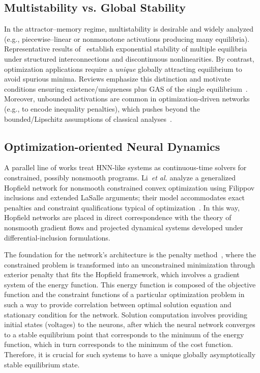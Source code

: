 \documentclass[journal]{IEEEtran}
\begin{document}
\subsection{Multistability vs. Global Stability}
In the attractor–memory regime, multistability is desirable and widely analyzed 
(e.g., piecewise–linear or nonmonotone activations producing many equilibria). 
Representative results of~\cite{NieZheng2015} establish exponential stability 
of multiple equilibria under structured interconnections and discontinuous nonlinearities. 
By contrast, optimization applications require a \emph{unique} globally attracting equilibrium 
to avoid spurious minima. 
Reviews emphasize this distinction and motivate conditions ensuring existence/uniqueness plus GAS 
of the single equilibrium~\cite{ZhangTNNLSReview2014}. 
Moreover, unbounded activations are common in optimization-driven networks 
(e.g., to encode inequality penalties), which pushes beyond the bounded/Lipschitz assumptions 
of classical analyses~\cite{NieZheng2015}.

\subsection{Optimization-oriented Neural Dynamics}

A parallel line of works treat HNN-like systems as continuous-time solvers for constrained, 
possibly nonsmooth programs. 
Li~\emph{et al.} analyze a generalized Hopfield network for nonsmooth constrained convex optimization 
using Filippov inclusions and extended LaSalle arguments; 
their model accommodates exact penalties and constraint qualifications typical of optimization~\cite{LiTNNLS2015}. 
In this way, Hopfield networks are placed in direct correspondence 
with the theory of nonsmooth gradient flows and projected dynamical systems 
developed under differential-inclusion formulations.


The foundation for the network’s architecture is the penalty method~\cite{penalty, 517}, where the constrained problem is transformed into an unconstrained minimization through exterior penalty that fits the Hopfield framework, which involves a gradient system of the energy function. This energy function is composed of the objective function and the constraint functions of a particular optimization problem in such a way to provide correlation between optimal solution equation and stationary condition for the network. Solution computation involves providing initial states (voltages) to the neurons, after which the neural network converges to a stable equilibrium point that corresponds to the minimum of the energy function, which in turn corresponds to the minimum
of the cost function. Therefore, it is crucial for such systems to have a unique globally asymptotically stable equilibrium state.
\end{document}
